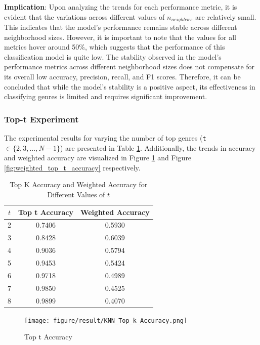 \documentclass[times, twocolumn]{article}
\begin{document}
\textbf{Implication}:
Upon analyzing the trends for each performance metric, it is evident that the variations across different values of $n_{neighbors}$ are relatively small. This indicates that the model's performance remains stable across different neighborhood sizes. However, it is important to note that the values for all metrics hover around 50\%, which suggests that the performance of this classification model is quite low. The stability observed in the model's performance metrics across different neighborhood sizes does not compensate for its overall low accuracy, precision, recall, and F1 scores. Therefore, it can be concluded that while the model's stability is a positive aspect, its effectiveness in classifying genres is limited and requires significant improvement.

\subsubsection{Top-t Experiment}
The experimental results for varying the number of top genres (\verb|t| $\in \{2, 3, \ldots, N-1\}$) are presented in Table \ref{tab:top_t}. Additionally, the trends in accuracy and weighted accuracy are visualized in Figure \ref{fig:top_t_accuracy} and Figure \ref{fig:weighted_top_t_accuracy} respectively.

\begin{table}[h]
    \centering
    \caption{Top K Accuracy and Weighted Accuracy for Different Values of $t$}
    \label{tab:top_t}
    \begin{tabular}{|c||c|c|}
    \hline
    $t$ & Top t Accuracy & Weighted Accuracy \\
    \hline
    2 & 0.7406 & 0.5930 \\
    3 & 0.8428 & 0.6039 \\
    4 & 0.9036 & 0.5794 \\
    5 & 0.9453 & 0.5424 \\
    6 & 0.9718 & 0.4989 \\
    7 & 0.9850 & 0.4525 \\
    8 & 0.9899 & 0.4070 \\
    \hline
    \end{tabular}
\end{table}

\begin{figure}[H]
    \centering
    \texttt{[image: figure/result/KNN\_Top\_k\_Accuracy.png]}
    \caption{Top t Accuracy}
    \label{fig:top_t_accuracy}
\end{figure}
\end{document}
